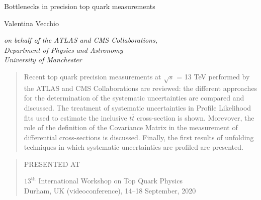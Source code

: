 \documentclass[12pt]{article}
\newcommand\pubnumber{SNSN-323-63}
\newcommand\pubdate{\today}
\def\institute{on behalf of the ATLAS and CMS Collaborations,\\Department of Physics and Astronomy\\ University of Manchester}
\def\Title#1{\begin{center} {\Large #1 } \end{center}}
\def\Author#1{\begin{center}{ \sc #1} \end{center}}
\def\Address#1{\begin{center}{ \it #1} \end{center}}
\newcommand\pubblock{\rightline{\begin{tabular}{l} \pubnumber\\
         \pubdate  \end{tabular}}}
\newenvironment{Abstract}{\begin{quotation}  }{\end{quotation}}
\newenvironment{Presented}{\begin{quotation} \begin{center} 
             PRESENTED AT\end{center}\bigskip 
      \begin{center}\begin{large}}{\end{large}\end{center} \end{quotation}}
\begin{document}
\linenumbers %
\begin{titlepage}
\pubblock

\vfill
\Title{Bottlenecks in precision top quark measurements}
\vfill
\Author{ Valentina Vecchio}
\Address{\institute}
\vfill
\begin{Abstract}
Recent top quark precision measurements at $\sqrt{s}$ = 13 TeV performed by the ATLAS and CMS Collaborations are reviewed: the different approaches for the determination of the systematic uncertainties are compared and discussed. 
The treatment of systematic uncertainties in Profile Likelihood fits used to estimate the inclusive $t\bar{t}$ cross-section is shown. Morevover, the role of the definition of the Covariance Matrix in the measurement of differential cross-sections is discussed. Finally, the first results of unfolding techniques in which systematic uncertainties are profiled are presented.

\end{Abstract}
\vfill
\begin{Presented}
$13^\mathrm{th}$ International Workshop on Top Quark Physics\\
Durham, UK (videoconference), 14--18 September, 2020
\end{Presented}
\vfill
\end{titlepage}
\def\thefootnote{\fnsymbol{footnote}}
\setcounter{footnote}{0}
%
\end{document}
